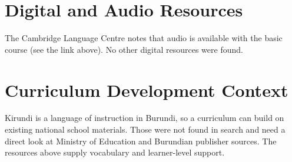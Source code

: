 \documentclass[12pt]{article}
\begin{document}
\section{Digital and Audio Resources}
The Cambridge Language Centre notes that audio is available with the basic course (see the link above). No other digital resources were found.

\section{Curriculum Development Context}
Kirundi is a language of instruction in Burundi, so a curriculum can build on existing national school materials. Those were not found in search and need a direct look at Ministry of Education and Burundian publisher sources. The resources above supply vocabulary and learner-level support.
\end{document}
